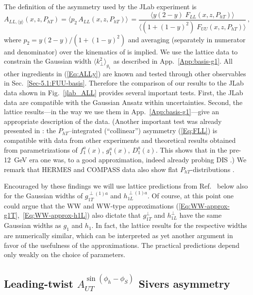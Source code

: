 \documentclass[a4paper,11pt]{article}
\newcommand{\be}{\begin{equation}}
\newcommand{\ee}{\end{equation}}
\newcommand{\la}{\langle}
\newcommand{\ra}{\rangle}
\def\Phperp{P_{hT}}
\def\kperp{k_\perp}
\begin{document}
The definition of the asymmetry used by the JLab experiment \cite{Avakian:2010ae} is
\be\label{Eq:ALLy}
	A_{LL,\la y\ra}(x,z,\Phperp)
	= \la p_2 \,A_{LL}(x,z,\Phperp) \ra \,
	= \frac{\la y (2-y) \; F_{LL}(x,z,\Phperp)\ra}
	{\la(1+(1-y)^2) \; F_{UU}(x,z,\Phperp)\ra} \, ,
\ee
where $p_2 = y (2-y)/(1+(1-y)^2)$ and averaging (separately in numerator
and denominator) over the kinematics of \cite{Avakian:2010ae} is implied.
We use the lattice data \cite{Hagler:2009mb} to
constrain the Gaussian width $\la\kperp^2\ra_{g_1}$ as described in
App.~\ref{App:basis-g1}. All other ingredients in (\ref{Eq:ALLy}) are known
and tested through other observables in Sec.~\ref{Sec-5.1:FUU-basis}.
Therefore the comparison of our results to the JLab data \cite{Avakian:2010ae}
shown in Fig.~\ref{jlab_ALL} provides several important tests.
First, the JLab data \cite{Avakian:2010ae} are compatible
with the Gaussian Ansatz within uncertainties. Second, the lattice
results---in the way we use them in App.~\ref{App:basis-g1}---give an 
appropriate description of the data.
	(Another important test was already presented in
	\cite{Avakian:2010ae}: the $\Phperp$--integrated (``collinear'')
	asymmetry (\ref{Eq:FLL}) is compatible with data
	from other experiments and theoretical results obtained from
	parametrizations of $f_1^a(x)$, $g_1^a(x)$, $D_1^a(z)$. This
	shows that in the pre-12~GeV era one was, to a good
	approximation, indeed already probing DIS \cite{Avakian:2010ae}.)
We remark that HERMES and COMPASS data also show flat 
$P_{hT}$-distributions \cite{Airapetian:2018rlq,Adolph:2016vou}.

Encouraged by these findings we will use lattice predictions from
Ref.~\cite{Hagler:2009mb} below also for the Gaussian widths of
$g_{1T}^{\perp(1)a}$ and $h_{1L}^{\perp(1)a}$.
Of course, at this point one could argue that the WW and WW-type
approximations (\ref{Eq:WW-approx-g1T},~\ref{Eq:WW-approx-h1L}) also
dictate that $g_{1T}^\perp$ and $h_{1L}^\perp$ have the same Gaussian
widths as $g_1$ and $h_1$. In fact, the lattice results for the
respective widths are numerically similar, which can be interpreted as
yet another argument in favor of the usefulness of the approximations.
The practical predictions depend only weakly on the choice of parameters.




\subsection{\boldmath Leading-twist $A_{UT}^{\sin(\phi_h-\phi_S)}$ Sivers asymmetry}
\label{Sec-5.3:Sivers-basis}
\end{document}
